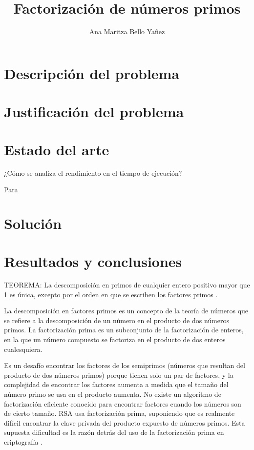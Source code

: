 \documentclass{article}
\begin{document}
\title{Factorización de números primos}
\author{Ana Maritza Bello Yañez}
\maketitle

\section{Descripción del problema}

\section{Justificación del problema}

\section{Estado del arte}

¿Cómo se analiza el rendimiento en el tiempo de ejecución?

Para 


\section{Solución}

\section{Resultados y conclusiones}

TEOREMA:
La descomposición en primos de cualquier entero positivo mayor que 1 es única,
excepto por el orden en que se escriben los factores primos \cite{lewinter2015elementary}.

La descomposición en factores primos es un concepto de la teoría de números que
se refiere a la descomposición de un número en el producto de dos números
primos. La factorización prima es un subconjunto de la factorización de enteros,
en la que un número compuesto se factoriza en el producto de dos enteros
cualesquiera.

Es un desafío encontrar los factores de los semiprimos (números que resultan del
producto de dos números primos) porque tienen solo un par de factores, y la
complejidad de encontrar los factores aumenta a medida que el tamaño del número
primo se usa en el producto aumenta. No existe un algoritmo de factorización
eficiente conocido para encontrar factores cuando los números son de cierto
tamaño. RSA usa factorización prima, suponiendo que es realmente difícil
encontrar la clave privada del producto expuesto de números primos. Esta
supuesta dificultad es la razón detrás del uso de la factorización prima en
criptografía \cite{raj2019foundations}.
\end{document}
